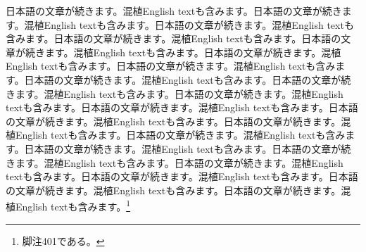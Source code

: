 \documentclass[pdflatex,book]{jlreq}
\begin{document}
日本語の文章が続きます。混植English textも含みます。日本語の文章が続きます。混植English textも含みます。日本語の文章が続きます。混植English textも含みます。日本語の文章が続きます。混植English textも含みます。日本語の文章が続きます。混植English textも含みます。日本語の文章が続きます。混植English textも含みます。日本語の文章が続きます。混植English textも含みます。日本語の文章が続きます。混植English textも含みます。日本語の文章が続きます。混植English textも含みます。日本語の文章が続きます。混植English textも含みます。日本語の文章が続きます。混植English textも含みます。日本語の文章が続きます。混植English textも含みます。日本語の文章が続きます。混植English textも含みます。日本語の文章が続きます。混植English textも含みます。日本語の文章が続きます。混植English textも含みます。日本語の文章が続きます。混植English textも含みます。日本語の文章が続きます。混植English textも含みます。日本語の文章が続きます。混植English textも含みます。日本語の文章が続きます。混植English textも含みます。日本語の文章が続きます。混植English textも含みます。\footnote{脚注401である。}
\end{document}
